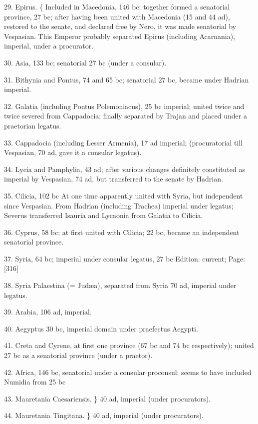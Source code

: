 29. Epirus. \{ Included in Macedonia, 146 bc; together formed a senatorial province, 27 bc; after having been united with Macedonia (15 and 44 ad), restored to the senate, and declared free by Nero, it was made senatorial by Vespasian. This Emperor probably separated Epirus (including Acarnania), imperial, under a procurator.

30. Asia, 133 bc; senatorial 27 bc (under a consular).

31. Bithynia and Pontus, 74 and 65 bc; senatorial 27 bc, became under Hadrian imperial.

32. Galatia (including Pontus Polemoniacus), 25 bc imperial; united twice and twice severed from Cappadocia; finally separated by Trajan and placed under a praetorian legatus.

33. Cappadocia (including Lesser Armenia), 17 ad imperial; (procuratorial till Vespasian, 70 ad, gave it a consular legatus).

34. Lycia and Pamphylia, 43 ad; after various changes definitely constituted as imperial by Vespasian, 74 ad, but transferred to the senate by Hadrian.

35. Cilicia, 102 bc At one time apparently united with Syria, but independent since Vespasian. From Hadrian (including Trachea) imperial under legatus; Severus transferred Isauria and Lycaonia from Galatia to Cilicia.

36. Cyprus, 58 bc; at first united with Cilicia; 22 bc, became an independent senatorial province.

37. Syria, 64 bc; imperial under consular legatus, 27 bc
Edition: current; Page: [316]

38. Syria Palaestina (= Judæa), separated from Syria 70 ad, imperial under legatus.

39. Arabia, 106 ad, imperial.

40. Aegyptus 30 bc, imperial domain under praefectus Aegypti.

41. Creta and Cyrene, at first one province (67 bc and 74 bc respectively); united 27 bc as a senatorial province (under a praetor).

42. Africa, 146 bc, senatorial under a consular proconsul; seems to have included Numidia from 25 bc

43. Mauretania Caesariensis. \} 40 ad, imperial (under procurators).

44. Mauretania Tingitana. \} 40 ad, imperial (under procurators).

